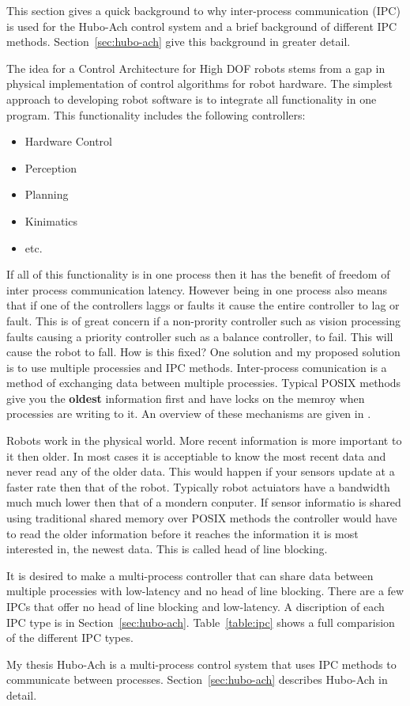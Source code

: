 
This section gives a quick background to why inter-process communication (IPC) is used for the Hubo-Ach control system and a brief background of different IPC methods.
Section~\ref{sec:hubo-ach} give this background in greater detail.

The idea for a Control Architecture for High DOF robots stems from a gap in physical implementation of control algorithms for robot hardware.
The simplest approach to developing robot software is to integrate all functionality in one program.  
This functionality includes the following controllers:
\begin{itemize}
\item Hardware Control
\item Perception
\item Planning
\item Kinimatics
\item etc.
\end{itemize}

If all of this functionality is in one process then it has the benefit of freedom of inter process communication latency.
However being in one process also means that if one of the controllers laggs or faults it cause the entire controller to lag or fault.
This is of great concern if a non-prority controller such as vision processing faults causing a priority controller such as a balance controller, to fail.
This will cause the robot to fall.
How is this fixed?
One solution and my proposed solution is to use multiple processies and IPC methods.
Inter-process comunication is a method of exchanging data between multiple processies.
Typical POSIX methods give you the \textbf{oldest} information first and have locks on the memroy when processies are writing to it.
An overview of these mechanisms are given in \cite{stevens2005advanced}.

Robots work in the physical world. 
More recent information is more important to it then older.
In most cases it is acceptiable to know the most recent data and never read any of the older data.
This would happen if your sensors update at a faster rate then that of the robot.
Typically robot actuiators have a bandwidth much much lower then that of a mondern conputer.
If sensor informatio is shared using traditional shared memory over POSIX methods the controller would have to read the older information before it reaches the information it is most interested in, the newest data.
This is called head of line blocking\cite{ach}.

It is desired to make a multi-process controller that can share data between multiple processies with low-latency and no head of line blocking.
There are a few IPCs that offer no head of line blocking and low-latency.  
A discription of each IPC type is in Section~\ref{sec:hubo-ach}.
Table~\ref{table:ipc} shows a full comparision of the different IPC types.

My thesis Hubo-Ach is a multi-process control system that uses IPC methods to communicate between processes.
Section~\ref{sec:hubo-ach} describes Hubo-Ach in detail.


